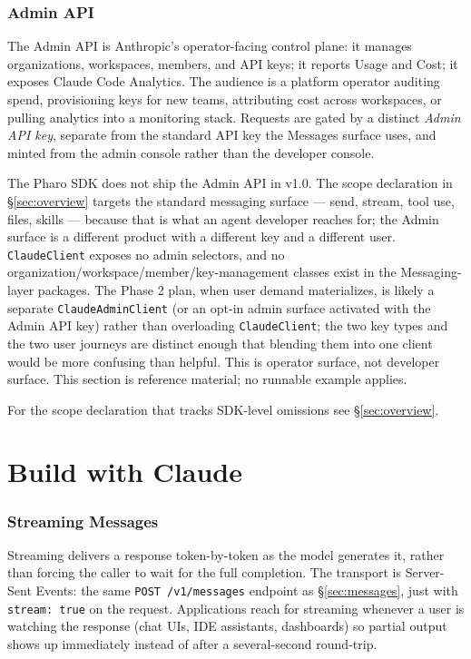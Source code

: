 \documentclass[a4paper,10pt,fleqn]{article}
\newcommand{\cls}[1]{\texttt{#1}}
\begin{document}
\section{Admin API}
\label{sec:admin}

The Admin API is Anthropic's operator-facing control plane: it
manages organizations, workspaces, members, and API keys; it
reports Usage and Cost; it exposes Claude Code Analytics.  The
audience is a platform operator auditing spend, provisioning keys
for new teams, attributing cost across workspaces, or pulling
analytics into a monitoring stack.  Requests are gated by a
distinct \emph{Admin API key}, separate from the standard API key
the Messages surface uses, and minted from the admin console
rather than the developer console.

The Pharo SDK does not ship the Admin API in v1.0.  The scope
declaration in \S\ref{sec:overview} targets the standard messaging
surface --- send, stream, tool use, files, skills --- because that
is what an agent developer reaches for; the Admin surface is a
different product with a different key and a different user.
\cls{ClaudeClient} exposes no admin selectors, and no
organization/workspace/member/key-management classes exist in the
Messaging-layer packages.  The Phase 2 plan, when user demand
materializes, is likely a separate \texttt{ClaudeAdminClient} (or
an opt-in admin surface activated with the Admin API key) rather
than overloading \cls{ClaudeClient}; the two key types and the two
user journeys are distinct enough that blending them into one
client would be more confusing than helpful.  This is operator
surface, not developer surface.  This section is reference
material; no runnable example applies.

For the scope declaration that tracks SDK-level omissions see
\S\ref{sec:overview}.

\medskip
{}


\part{Build with Claude}

\section{Streaming Messages}
\label{sec:streaming}

Streaming delivers a response token-by-token as the model
generates it, rather than forcing the caller to wait for the
full completion.  The transport is Server-Sent Events: the same
\texttt{POST /v1/messages} endpoint as
\S\ref{sec:messages}, just with \texttt{stream: true} on the
request.  Applications reach for streaming whenever a user is
watching the response (chat UIs, IDE assistants, dashboards)
so partial output shows up immediately instead of after a
several-second round-trip.
\end{document}
